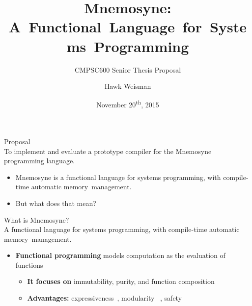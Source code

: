 \documentclass{beamer}
\title[Mnemosyne]{Mnemosyne: A~Functional~Language~for~Systems~Programming}
\subtitle{CMPSC600 Senior Thesis Proposal}
\author[Hawk Weisman]{Hawk Weisman}
\institute[Allegheny College]{Department of Computer Science \\ Allegheny College}
\date{November 20\textsuperscript{th}, 2015}
\begin{document}
\maketitle

\begin{frame}
\alert{\huge{Proposal}}\\
\large{To implement and evaluate a prototype compiler for the Mnemosyne programming language.}
\begin{itemize}
    \item Mnemosyne is a functional language for systems programming, with compile-time automatic memory~management.
    \item But what does that mean?
\end{itemize}
\end{frame}

\begin{frame}
\alert{\huge{What is Mnemosyne?}}\\
\large{\alert{A functional language} for systems programming, with compile-time automatic memory~management.} \normalsize
\begin{itemize}
\item<2->
\textbf{Functional programming} models computation as the evaluation of functions~\cite{Wise:2003:FP:1074100.1074416,hughes1989functional}
\begin{itemize}
    \item<2-> \textbf{It focuses on} immutability, purity, and function composition
    \item<3> \textbf{Advantages:} expressiveness~\cite{hughes1989functional,hudak1994haskell}, modularity %
    ~\cite{hughes1989functional,hudak1994haskell}, safety
    \end{itemize}
\end{itemize}
\end{frame}
\end{document}
